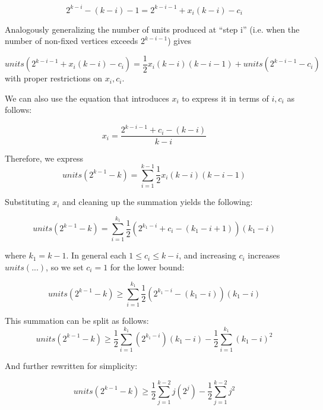 \documentclass[a4paper,UKenglish,cleveref, autoref, thm-restate]{lipics-v2021}
\begin{document}
\begin{equation}
2^{k-i} - (k - i) - 1= 2^{k-i-1} + x_i(k-i) - c_i  
\end{equation}


Analogously generalizing the number of units produced at ``step i'' (i.e. when the number of non-fixed vertices exceeds $2^{k-i-1}$) gives

\begin{equation}
units(2^{k-i-1} + x_i(k-i) - c_i) = \frac{1}{2}x_i(k-i)(k-i-1) + units(2^{k-i-1} - c_i)
\end{equation}
with proper restrictions on $x_i, c_i$. 

We can also use the equation that introduces $x_i$ to express it in terms of $i, c_i$ as follows: 

\begin{equation}
x_i = \frac{2^{k-i-1} + c_i - (k - i)}{k-i}
\end{equation}

Therefore, we express 
\begin{equation}
units(2^{k-1} - k) = \sum\limits_{i=1}^{k-1}\frac{1}{2}x_i(k-i)(k-i-1)
\end{equation}

Substituting $x_i$ and cleaning up the summation yields the following:

\begin{equation}
units(2^{k-1} - k) = \sum\limits_{i=1}^{k_1}\frac{1}{2}(2^{k_1-i} + c_i - (k_1 - i + 1))(k_1-i)
\end{equation}

where $k_1 = k - 1$. In general each $1\leq c_i\leq k - i$, and increasing $c_i$ increases $units(...)$, so we set $c_i = 1$ for the lower bound:

\begin{equation}
units(2^{k-1} - k) \geq \sum\limits_{i=1}^{k_1}\frac{1}{2}(2^{k_1-i} - (k_1 - i))(k_1-i)
\end{equation}

This summation can be split as follows:
\begin{equation}
units(2^{k-1} - k) \geq \frac{1}{2}\sum\limits_{i=1}^{k_1}(2^{k_1-i})(k_1-i) - \frac{1}{2}\sum\limits_{i=1}^{k_1}(k_1-i)^2
\end{equation}

And further rewritten for simplicity:

\begin{equation}
units(2^{k-1} - k) \geq \frac{1}{2}\sum\limits_{j=1}^{k-2}j(2^{j}) - \frac{1}{2}\sum\limits_{j=1}^{k-2}j^2
\end{equation}
\end{document}
